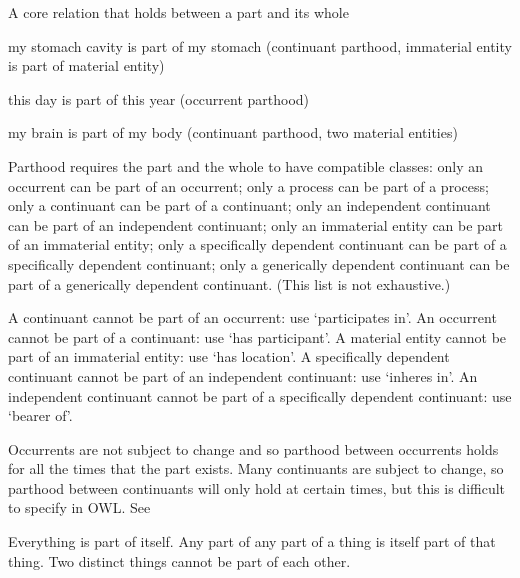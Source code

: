 \documentclass[letterpaper,10pt,english]{sphinxmanual}
\begin{document}
\begin{sphinxShadowBox}

\sphinxAtStartPar
{\hyperref[\detokenize{doc-RO_0002131::doc}]{}}
\end{sphinxShadowBox}

\begin{sphinxShadowBox}

\sphinxAtStartPar
A core relation that holds between a part and its whole
\end{sphinxShadowBox}

\begin{sphinxShadowBox}

\sphinxAtStartPar
my stomach cavity is part of my stomach (continuant parthood, immaterial entity is part of material entity)

\sphinxAtStartPar
this day is part of this year (occurrent parthood)

\sphinxAtStartPar
my brain is part of my body (continuant parthood, two material entities)
\end{sphinxShadowBox}

\begin{sphinxShadowBox}

\sphinxAtStartPar
Parthood requires the part and the whole to have compatible classes: only an occurrent can be part of an occurrent; only a process can be part of a process; only a continuant can be part of a continuant; only an independent continuant can be part of an independent continuant; only an immaterial entity can be part of an immaterial entity; only a specifically dependent continuant can be part of a specifically dependent continuant; only a generically dependent continuant can be part of a generically dependent continuant. (This list is not exhaustive.)

\sphinxAtStartPar
A continuant cannot be part of an occurrent: use ‘participates in’. An occurrent cannot be part of a continuant: use ‘has participant’. A material entity cannot be part of an immaterial entity: use ‘has location’. A specifically dependent continuant cannot be part of an independent continuant: use ‘inheres in’. An independent continuant cannot be part of a specifically dependent continuant: use ‘bearer of’.

\sphinxAtStartPar
Occurrents are not subject to change and so parthood between occurrents holds for all the times that the part exists. Many continuants are subject to change, so parthood between continuants will only hold at certain times, but this is difficult to specify in OWL. See 

\sphinxAtStartPar
Everything is part of itself. Any part of any part of a thing is itself part of that thing. Two distinct things cannot be part of each other.
\end{sphinxShadowBox}
\end{document}

